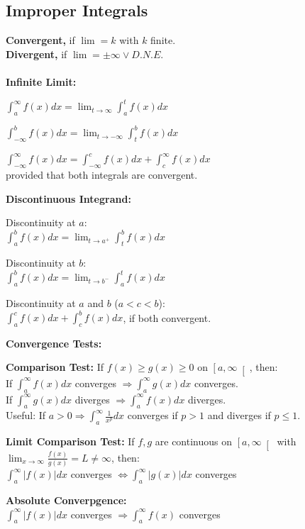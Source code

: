 \documentclass[8pt,a4paper]{extarticle}     %
\theoremstyle{definition}
\theoremstyle{definition}
\theoremstyle{definition}
\begin{document}
\begin{multicols}{4}
\subsection{Improper Integrals}
\textbf{Convergent,} if $\lim = k$ with $k$ finite. \\
\textbf{Divergent,} if $\lim = \pm\infty \lor D.N.E.$ \\ \\
\textbf{Infinite Limit:}
\begin{eqlist}
	\item $\int_a^\infty f(x)dx = \lim_{t\to\infty}\int_a^t f(x)dx$
	\item $\int_{-\infty}^{b} f(x)dx = \lim_{t\to-\infty}\int_{t}^{b} f(x)dx$
	\item $\int_{-\infty}^{\infty} f(x)dx = \int_{-\infty}^{c} f(x)dx+\int_c^\infty f(x)dx$ \\ provided that both integrals are convergent.
\end{eqlist}
\textbf{Discontinuous Integrand:}
\begin{eqlist}
	\item Discontinuity at $a$: \\ $\int_a^b f(x)dx = \lim_{t\to a^+}\int_t^b f(x)dx$
	\item Discontinuity at $b$: \\ $\int_a^b f(x)dx = \lim_{t\to b^-}\int_a^t f(x)dx$
	\item Discontinuity at $a$ and $b$ ($a<c<b$): \\ $\int_a^c f(x)dx + \int_c^b f(x)dx$, if both convergent.
\end{eqlist}
\textbf{Convergence Tests:}
\begin{bulletlist}
	\item \textbf{Comparison Test:} If $f(x) \geq g(x) \geq 0$ on $\left[a,\infty\right[$, then: \\
	If $\int_a^\infty f(x)dx$ converges $\Rightarrow \int_a^\infty g(x)dx$ converges. \\
	If $\int_a^\infty g(x)dx$ diverges $\Rightarrow \int_a^\infty f(x)dx$ diverges. \\
	Useful: If $a>0 \Rightarrow \int_a^\infty \frac{1}{x^p}dx$ converges if $p>1$ and diverges if $p\leq1$.
	\item \textbf{Limit Comparison Test:} If $f,g$ are continuous on $\left[a,\infty\right[$ with $\lim_{x\to\infty} \frac{f(x)}{g(x)}=L\neq\infty$, then: \\
	$\int_a^\infty |f(x)|dx$ converges $\Leftrightarrow \int_a^\infty |g(x)|dx$ converges
	\item \textbf{Absolute Converpgence:} \\ $\int_a^\infty |f(x)|dx$ converges $\Rightarrow \int_a^\infty f(x)$ converges

\end{bulletlist}
\end{multicols}
\end{document}
